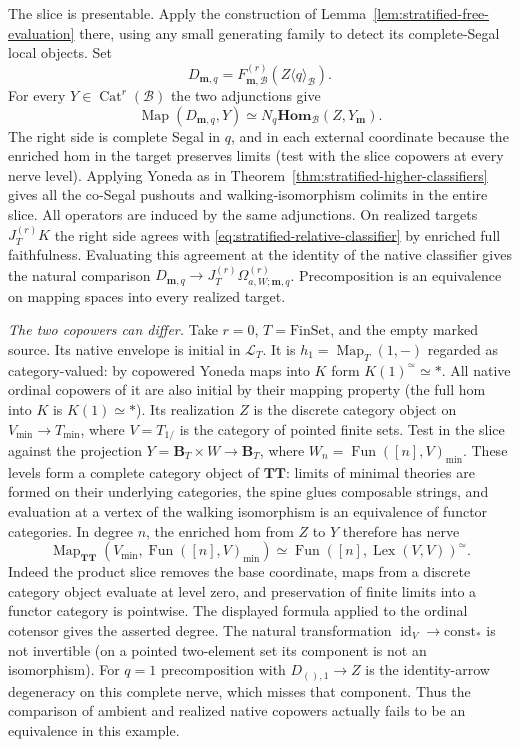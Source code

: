 \documentclass[oneside]{article}
\theoremstyle{plain}
\theoremstyle{definition}
\theoremstyle{remark}
\newcommand{\B}{\mathbf B}
\newcommand{\Fun}{\operatorname{Fun}}
\newcommand{\Homc}{\mathbf{Hom}}
\newcommand{\J}{J}
\newcommand{\LT}{\mathcal L_T}
\newcommand{\Lex}{\operatorname{Lex}}
\newcommand{\Map}{\operatorname{Map}}
\newcommand{\TT}{\mathbf{TT}}
\newcommand{\core}{\simeq}
\newcommand{\id}{\operatorname{id}}
\newcommand{\minrep}{\mathrm{min}}
\begin{document}
The slice is presentable. Apply the construction of
Lemma~\ref{lem:stratified-free-evaluation} there, using any small
generating family to detect its complete-Segal local objects. Set
\[
 D_{\mathbf m,q}=F^{(r)}_{\mathbf m,\mathcal B}
       (Z\langle q\rangle_{\mathcal B}).
\]
For every $Y\in\operatorname{Cat}^r(\mathcal B)$ the two adjunctions give
\[
 \Map(D_{\mathbf m,q},Y)\simeq N_q\Homc_{\mathcal B}(Z,Y_{\mathbf m}).
\]
The right side is complete Segal in $q$, and in each external
coordinate because the enriched hom in the target preserves limits
(test with the slice copowers at every nerve level). Applying Yoneda
as in Theorem~\ref{thm:stratified-higher-classifiers} gives all the
co-Segal pushouts and walking-isomorphism colimits in the entire slice.
All operators are induced by the same adjunctions. On realized targets
$\J_T^{(r)}K$ the right side agrees with
\eqref{eq:stratified-relative-classifier} by enriched full faithfulness.
Evaluating this agreement at the identity of the native classifier
gives the natural comparison
$D_{\mathbf m,q}\to\J_T^{(r)}\Omega^{(r)}_{a,W;\mathbf m,q}$.
Precomposition is an equivalence on mapping spaces into every
realized target.

\emph{The two copowers can differ.} Take $r=0$, $T=\mathrm{FinSet}$,
and the empty marked source. Its native envelope is initial in $\LT$.
It is $h_1=\Map_T(1,-)$ regarded as category-valued: by copowered
Yoneda maps into $K$ form $K(1)^\core\simeq *$. All native ordinal
copowers of it are also initial by their mapping property (the full
hom into $K$ is $K(1)\simeq *$). Its realization $Z$ is the discrete
category object on $V_{\minrep}\to T_{\minrep}$,
where $V=T_{1/}$ is the category of pointed finite sets. Test in
the slice against the projection $Y=\B_T\times W\to\B_T$, where
$W_n=\Fun([n],V)_{\minrep}$. These levels form a complete category
object of $\TT$: limits of minimal theories are formed on their
underlying categories, the spine glues composable strings, and
evaluation at a vertex of the walking isomorphism is an equivalence
of functor categories. In degree $n$, the enriched hom from $Z$ to $Y$
therefore has nerve
\[
 \Map_{\TT}(V_{\minrep},\Fun([n],V)_{\minrep})
       \simeq \Fun([n],\Lex(V,V))^\core.
\]
Indeed the product slice removes the base coordinate, maps from a
discrete category object evaluate at level zero, and preservation of
finite limits into a functor category is pointwise. The displayed
formula applied to the ordinal cotensor gives the asserted degree.
The natural transformation $\id_V\to\mathrm{const}_*$ is not invertible
(on a pointed two-element set its component is not an isomorphism).
For $q=1$ precomposition with $D_{(),1}\to Z$ is the identity-arrow
degeneracy on this complete nerve, which misses that component.
Thus the comparison of ambient and realized native copowers actually
fails to be an equivalence in this example.
\end{document}
